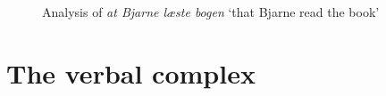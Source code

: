 \begin{enumerate}
\begin{figure}
\caption{\label{fig-at-bjarne-laeste-bogen}Analysis of \emph{at Bjarne læste bogen} `that Bjarne
  read the book'}
\end{figure}



\end{enumerate}


\section{The verbal complex}

